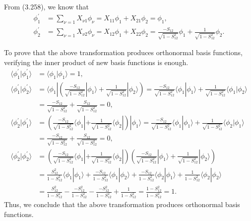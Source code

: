 \documentclass[a4paper]{book}
\newcounter{solution}[chapter]
\begin{document}
	\begin{solution}
	
	From (3.258), we know that
	\begin{align*}
		\phi^\prime_1 &= \sum_{ \nu=1 } X_{\nu 1} \phi_\nu = X_{11} \phi_1 + X_{21} \phi_2 = \phi_1 , \\
		\phi^\prime_2 &= \sum_{ \nu=1 } X_{\nu 2} \phi_\nu = X_{12} \phi_1 + X_{22} \phi_2 = \frac{ -S_{12} }{ \sqrt{ 1 - S^2_{12} } } \phi_1 + \frac{ 1 }{ \sqrt{ 1 - S^2_{12} } } \phi_2 .
	\end{align*}
	
	To prove that the above transformation produces orthonormal basis functions, verifying the inner product of new basis functions is enough.
	\begin{align*}
		\langle \phi^\prime_1 | \phi^\prime_1 \rangle &= \langle \phi_1 | \phi_1 \rangle = 1 , \\
		\langle \phi^\prime_1 | \phi^\prime_2 \rangle &= \langle \phi_1 | \left( \frac{ -S_{12} }{ \sqrt{ 1 - S^2_{12} } }  | \phi_1 \rangle + \frac{ 1 }{ \sqrt{ 1 - S^2_{12} } } | \phi_2 \rangle \right) = \frac{ -S_{12} }{ \sqrt{ 1 - S^2_{12} } } \langle \phi_1 | \phi_1 \rangle + \frac{ 1 }{ \sqrt{ 1 - S^2_{12} } } \langle \phi_1 | \phi_2 \rangle \\
		&= \frac{ -S_{12} }{ \sqrt{ 1 - S^2_{12} } } + \frac{ S_{12} }{ \sqrt{ 1 - S^2_{12} } } = 0 , \\
		\langle \phi^\prime_2 | \phi^\prime_1 \rangle &= \left( \frac{ -S_{12} }{ \sqrt{ 1 - S^2_{12} } }  \langle \phi_1 | + \frac{ 1 }{ \sqrt{ 1 - S^2_{12} } } \langle \phi_2 | \right) | \phi_1 \rangle = \frac{ -S_{12} }{ \sqrt{ 1 - S^2_{12} } }  \langle \phi_1 | \phi_1 \rangle + \frac{ 1 }{ \sqrt{ 1 - S^2_{12} } } \langle \phi_2 | \phi_1 \rangle \\
		&= \frac{ -S_{12} }{ \sqrt{ 1 - S^2_{12} } } + \frac{ S_{12} }{ \sqrt{ 1 - S^2_{12} } } = 0 , \\
		\langle \phi^\prime_2 | \phi^\prime_2 \rangle &= \left( \frac{ -S_{12} }{ \sqrt{ 1 - S^2_{12} } } \langle \phi_1 | + \frac{ 1 }{ \sqrt{ 1 - S^2_{12} } } \langle \phi_2 | \right) \left( \frac{ -S_{12} }{ \sqrt{ 1 - S^2_{12} } }  | \phi_1 \rangle + \frac{ 1 }{ \sqrt{ 1 - S^2_{12} } } | \phi_2 \rangle \right) \\
		&= \frac{ S^2_{12} }{ 1 - S^2_{12} } \langle \phi_1 | \phi_1 \rangle + \frac{ -S_{12} }{ 1 - S^2_{12} } \langle \phi_1 | \phi_2 \rangle + \frac{ -S_{12} }{ 1 - S^2_{12} } \langle \phi_2 | \phi_1 \rangle + \frac{ 1 }{ 1 - S^2_{12} } \langle \phi_2 | \phi_2 \rangle \\
		&= \frac{ S^2_{12} }{ 1 - S^2_{12} } - \frac{ -S^2_{12} }{ 1 - S^2_{12} } - \frac{ -S^2_{12} }{ 1 - S^2_{12} } + \frac{ 1 }{ 1 - S^2_{12} } = \frac{ 1 - S^2_{12} }{ 1 - S^2_{12} } = 1 .
	\end{align*}
	Thus, we conclude that the above transformation produces orthonormal basis functions.
	
	\end{solution}
	
\end{document}
